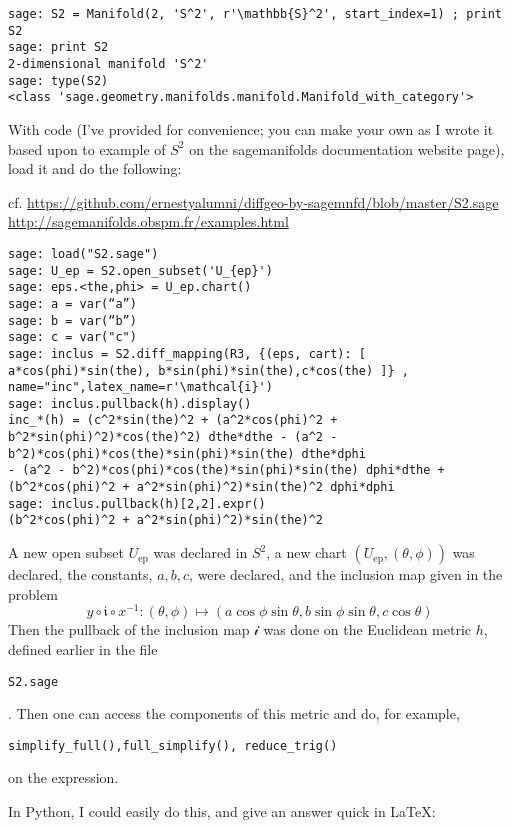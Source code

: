 \documentclass[10pt, twoside]{amsart}
\begin{document}
\begin{multicols*}{2}
{\small \begin{verbatim}
sage: S2 = Manifold(2, 'S^2', r'\mathbb{S}^2', start_index=1) ; print S2
sage: print S2
2-dimensional manifold 'S^2'
sage: type(S2)
<class 'sage.geometry.manifolds.manifold.Manifold_with_category'>
\end{verbatim}}

With code (I’ve provided for convenience; you can make your own as I wrote it based upon to example of $S^2$ on the sagemanifolds documentation website page), load it and do the following:

cf. \url{https://github.com/ernestyalumni/diffgeo-by-sagemnfd/blob/master/S2.sage} \\
\url{http://sagemanifolds.obspm.fr/examples.html}

{\scriptsize \begin{verbatim}
sage: load("S2.sage")
sage: U_ep = S2.open_subset('U_{ep}')
sage: eps.<the,phi> = U_ep.chart()
sage: a = var(“a”)
sage: b = var(“b”)
sage: c = var("c")
sage: inclus = S2.diff_mapping(R3, {(eps, cart): [ a*cos(phi)*sin(the), b*sin(phi)*sin(the),c*cos(the) ]} , name="inc",latex_name=r'\mathcal{i}')
sage: inclus.pullback(h).display()
inc_*(h) = (c^2*sin(the)^2 + (a^2*cos(phi)^2 + b^2*sin(phi)^2)*cos(the)^2) dthe*dthe - (a^2 - b^2)*cos(phi)*cos(the)*sin(phi)*sin(the) dthe*dphi 
- (a^2 - b^2)*cos(phi)*cos(the)*sin(phi)*sin(the) dphi*dthe + (b^2*cos(phi)^2 + a^2*sin(phi)^2)*sin(the)^2 dphi*dphi
sage: inclus.pullback(h)[2,2].expr()
(b^2*cos(phi)^2 + a^2*sin(phi)^2)*sin(the)^2
\end{verbatim}
}
A new open subset $U_{\text{ep}}$ was declared in $S^2$, a new chart $(U_{\text{ep}}, (\theta,\phi))$ was declared, the constants, $a,b,c$, were declared, and the inclusion map given in the problem
\[
y\circ \mathfrak{i} \circ x^{-1} : (\theta, \phi) \mapsto ( a\cos{\phi} \sin{\theta}, b \sin{\phi} \sin{\theta}, c\cos{\theta})
\]
Then the pullback of the inclusion map $\mathcal{i}$ was done on the Euclidean metric $h$, defined earlier in the file \begin{verbatim}S2.sage\end{verbatim}.  Then one can access the components of this metric and do, for example, \begin{verbatim}simplify_full(),full_simplify(), reduce_trig()\end{verbatim} on the expression.  

In Python, I could easily do this, and give an answer quick in LaTeX:


\end{multicols*}
\end{document}

